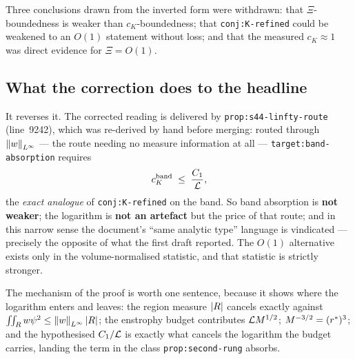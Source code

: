 Three conclusions drawn from the inverted form were withdrawn: that
\(\Xi\)-boundedness is weaker than \(c_K\)-boundedness; that
\texttt{conj:K-refined} could be weakened to an \(O(1)\) statement without
loss; and that the measured \(c_K\approx1\) was direct evidence for
\(\Xi=O(1)\).

\subsection{What the correction does to the headline}

It reverses it. The corrected reading is delivered by
\texttt{prop:s44-linfty-route} (line~9242), which was re-derived by hand
before merging: routed through \(\left\|w\right\|_{L^\infty}\) --- the route needing no
measure information at all --- \texttt{target:band-absorption} requires
\[
  c_K^{\mathrm{band}} \;\le\; \frac{C_1}{\mathcal{L}},
\]
the \emph{exact analogue} of \texttt{conj:K-refined} on the band. So band
absorption is \textbf{not weaker}; the logarithm is \textbf{not an artefact}
but the price of that route; and in this narrow sense the document's ``same
analytic type'' language is vindicated --- precisely the opposite of what the
first draft reported. The \(O(1)\) alternative exists only in the
volume-normalised statistic, and that statistic is strictly stronger.

The mechanism of the proof is worth one sentence, because it shows where the
logarithm enters and leaves: the region measure \(\left|R\right|\) cancels exactly
against \(\iint_R w\psi^2\le\left\|w\right\|_{L^\infty}\left|R\right|\); the enstrophy budget
contributes \(\mathcal{L} M^{1/2}\); \(M^{-3/2}=(r^{*})^3\); and the hypothesised
\(C_1/\mathcal{L}\) is exactly what cancels the logarithm the budget carries,
landing the term in the class \texttt{prop:second-rung} absorbs.

